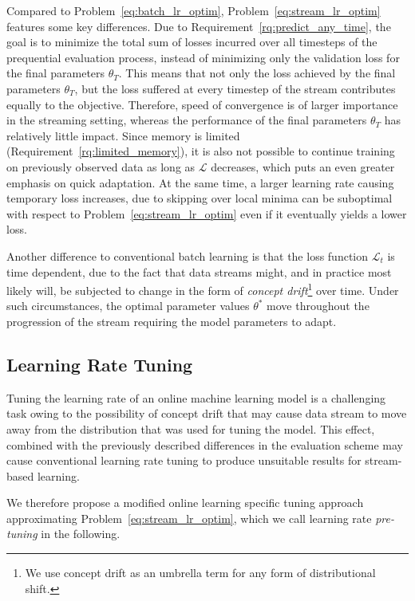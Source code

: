 \documentclass[letterpaper]{article} %
\begin{document}
Compared to Problem~\eqref{eq:batch_lr_optim}, Problem~\eqref{eq:stream_lr_optim} features some key differences.
Due to Requirement~\ref{rq:predict_any_time}, the goal is to minimize the total sum of losses incurred over all timesteps of the prequential evaluation process, instead of minimizing only the validation loss for the final parameters $\theta_T$.
This means that not only the loss achieved by the final parameters $\theta_T$, but the loss suffered at every timestep of the stream contributes equally to the objective.
Therefore, speed of convergence is of larger importance in the streaming setting, whereas the performance of the final parameters $\theta_T$ has relatively little impact.
Since memory is limited (Requirement~\ref{rq:limited_memory}), it is also not possible to continue training on previously observed data as long as $\mathcal{L}$ decreases, which puts an even greater emphasis on quick adaptation.
At the same time, a larger learning rate causing temporary loss increases, due to skipping over local minima can be suboptimal with respect to Problem~\eqref{eq:stream_lr_optim} even if it eventually yields a lower loss.

Another difference to conventional batch learning is that the loss function $\mathcal{L}_t$ is time dependent, due to the fact that data streams might, and in practice most likely will, be subjected to change in the form of \textit{concept drift}\footnote{We use concept drift as an umbrella term for any form of distributional shift.} over time.
Under such circumstances, the optimal parameter values $\theta^*$ move throughout the progression of the stream requiring the model parameters to adapt.

\subsection{Learning Rate Tuning}\label{subsec:pre-tuning}

Tuning the learning rate of an online machine learning model is a challenging task owing to the possibility of concept drift that may cause data stream to move away from the distribution that was used for tuning the model.
This effect, combined with the previously described differences in the evaluation scheme may cause conventional learning rate tuning to produce unsuitable results for stream-based learning.

We therefore propose a modified online learning specific tuning approach approximating Problem~\eqref{eq:stream_lr_optim}, which we call learning rate \textit{pre-tuning} in the following.
\end{document}
